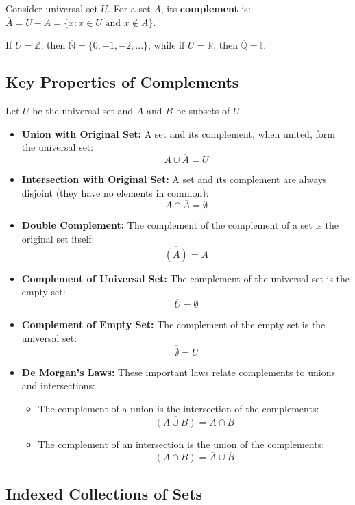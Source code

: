 \documentclass[../Main.tex]{subfiles}
\begin{document}
Consider universal set $U$. For a set $A$, its \textbf{complement} is: 
$\overline{A} = U - A = \{x : x \in U \text{ and } x \notin A\}$.

If $U = \mathbb{Z}$, then $\overline{\mathbb{N}} = \{0, -1, -2, \dots\}$; while if $U = \mathbb{R}$, then $\overline{\mathbb{Q}} = \mathbb{I}$.

\subsection*{Key Properties of Complements}

Let $U$ be the universal set and $A$ and $B$ be subsets of $U$.

\begin{itemize}
    \item \textbf{Union with Original Set:} A set and its complement, when united, form the universal set:
    \[A \cup \overline{A} = U\]
    \item \textbf{Intersection with Original Set:} A set and its complement are always disjoint (they have no elements in common):
    \[A \cap \overline{A} = \emptyset\]
    \item \textbf{Double Complement:} The complement of the complement of a set is the original set itself:
    \[\overline{(\overline{A})} = A\]
    \item \textbf{Complement of Universal Set:} The complement of the universal set is the empty set:
    \[\overline{U} = \emptyset\]
    \item \textbf{Complement of Empty Set:} The complement of the empty set is the universal set:
    \[\overline{\emptyset} = U\]
    \item \textbf{De Morgan's Laws:} These important laws relate complements to unions and intersections:
    \begin{itemize}
        \item The complement of a union is the intersection of the complements:
        \[\overline{(A \cup B)} = \overline{A} \cap \overline{B}\]
        \item The complement of an intersection is the union of the complements:
        \[\overline{(A \cap B)} = \overline{A} \cup \overline{B}\]
    \end{itemize}
\end{itemize}

\subsection{Indexed Collections of Sets}
\end{document}
